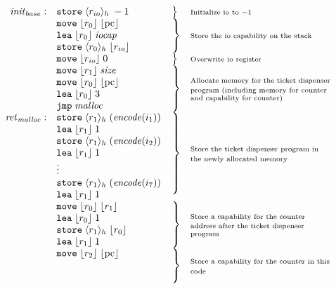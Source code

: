 \documentclass{article}
\newcommand{\pcreg}{\mathrm{pc}}
\newcommand{\plainfun}[2]{
  \ifthenelse{\equal{#2}{}}
             {\mathit{#1}}
             {\mathit{#1}(#2)}
}
\newcommand{\encode}{\plainfun{encode}{}}
\newcommand{\codelabel}[1]{\mathit{#1}}
\newcommand{\malloc}{\codelabel{malloc}}
\newcommand{\iocap}{\codelabel{iocap}}
\newcommand{\refreg}[1]{\lfloor #1 \rfloor}
\newcommand{\refheap}[1]{\langle #1 \rangle_h}
\newcommand{\zinstr}[1]{\mathtt{#1}}
\newcommand{\oneinstr}[2]{\zinstr{#1} \; #2}
\newcommand{\jmp}[1]{\oneinstr{jmp}{#1}}
\newcommand{\twoinstr}[3]{\zinstr{#1} \; #2 \; #3}
\newcommand{\move}[2]{\twoinstr{move}{#1}{#2}}
\newcommand{\store}[2]{\twoinstr{store}{#1}{#2}}
\newcommand{\lea}[2]{\twoinstr{lea}{#1}{#2}}
\begin{document}
\[
  \begin{array}{r l l p{\mrlen}}
\initb:     & \store{\refheap{\rio}}{-1} & \bracket{1} & \annotate{1}{Initialize io to $-1$} \\
           & \move{\refreg{r_0}}{\refreg{\pcreg}} & \bracket{3} & \annotate{3}{Store the io capability on the stack} \\
           & \lea{\refreg{r_0}}{\iocap} & & \\
           & \store{\refheap{r_0}}{\refreg{\rio}} & & \\
           & \move{\refreg{\rio}}{0} & \bracket{1} & \annotate{1}{Overwrite io register} \\
           & \move{\refreg{r_1}}{\size} &  \bracket{4} & \annotate{4}{Allocate memory for the ticket dispenser program (including memory for counter and capability for counter)}\\
           & \move{\refreg{r_0}}{\refreg{\pcreg}} & & \\
           & \lea{\refreg{r_0}}{3} & & \\
           & \jmp{\malloc} & & \\
\retm:     & \store{\refheap{r_1}}{(\encode(i_1))} & \bracket{7} & \annotate{7}{Store the ticket dispenser program in the newly allocated memory} \\
           & \lea{\refreg{r_1}}{1} & & \\
           & \store{\refheap{r_1}}{(\encode(i_2))} & & \\
           & \lea{\refreg{r_1}}{1} & & \\
           & \vdots & & \\
           & \store{\refheap{r_1}}{(\encode(i_7))} & & \\
           & \lea{\refreg{r_1}}{1} & & \\
           & \move{\refreg{r_0}}{\refreg{r_1}} & \bracket{4} & \annotate{4}{Store a capability for the counter address after the ticket dispenser program} \\
           & \lea{\refreg{r_0}}{1} & & \\
           & \store{\refheap{r_1}}{\refreg{r_0}} & & \\
           & \lea{\refreg{r_1}}{1} & & \\
           & \move{\refreg{r_2}}{\refreg{\pcreg}} & \bracket{3} & \annotate{3}{Store a capability for the counter in this code} \\

\end{array}\]
\end{document}
